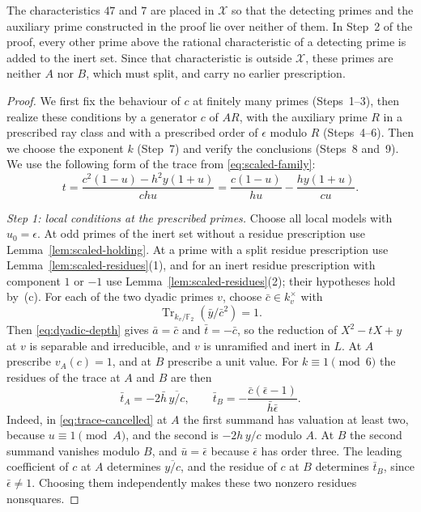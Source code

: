 \documentclass[11pt]{article}
\theoremstyle{plain}
\theoremstyle{definition}
\theoremstyle{remark}
\newcommand{\F}{\mathbb F}
\begin{document}
The characteristics $47$ and $7$ are placed in $\mathcal X$ so that the
detecting primes and the auxiliary prime constructed in the proof lie
over neither of them.  In Step~2 of the proof, every other prime above
the rational characteristic of a detecting prime is added to the inert
set.  Since that characteristic is outside $\mathcal X$, these primes are
neither $A$ nor $B$, which must split, and carry no earlier prescription.

\begin{proof}
We first fix the behaviour of $c$ at finitely many primes (Steps~1--3),
then realize these conditions by a generator $c$ of $AR$, with the
auxiliary prime $R$ in a prescribed ray class and with a prescribed
order of $\epsilon$ modulo $R$ (Steps~4--6).  Then we choose the exponent
$k$ (Step~7) and verify the conclusions (Steps~8 and~9).  We use the
following form of the trace from \eqref{eq:scaled-family}:
\begin{equation}\label{eq:trace-cancelled}
 t=\frac{c^2(1-u)-h^2y(1+u)}{chu}
  =\frac{c(1-u)}{hu}-\frac{hy(1+u)}{cu}.
\end{equation}

\emph{Step 1: local conditions at the prescribed primes.}  Choose all
local models with $u_0=\epsilon$.  At odd primes of the inert set without
a residue prescription use Lemma~\ref{lem:scaled-holding}.  At a prime
with a split residue prescription use Lemma~\ref{lem:scaled-residues}(1),
and for an inert residue prescription with component $1$ or $-1$ use
Lemma~\ref{lem:scaled-residues}(2); their hypotheses hold by~(c).  For each of the two dyadic primes
$v$, choose $\bar c\in k_v^\times$ with
\[
 \operatorname{Tr}_{k_v/\F_2}(\bar y/\bar c^2)=1.
\]
Then \eqref{eq:dyadic-depth} gives $\bar a=\bar c$ and $\bar t=-\bar c$,
so the reduction of $X^2-tX+y$ at $v$ is separable and irreducible, and
$v$ is unramified and inert in $L$.  At $A$ prescribe $v_A(c)=1$, and at
$B$ prescribe a unit value.  For $k\equiv1\pmod6$ the residues of the
trace at $A$ and $B$ are then
\begin{equation}\label{eq:active-traces}
 \bar t_A=-2\bar h\,\overline{y/c},\qquad
 \bar t_B=-\frac{\bar c(\bar\epsilon-1)}{\bar h\bar\epsilon}.
\end{equation}
Indeed, in \eqref{eq:trace-cancelled} at $A$ the first summand has
valuation at least two, because $u\equiv1\pmod A$, and the second is
$-2h\,y/c$ modulo $A$.  At $B$ the second summand vanishes modulo $B$,
and $\bar u=\bar\epsilon$ because $\bar\epsilon$ has order three.  The
leading coefficient of $c$ at $A$ determines $\overline{y/c}$, and the
residue of $c$ at $B$ determines $\bar t_B$, since $\bar\epsilon\ne1$.
Choosing them independently makes these two nonzero residues
nonsquares.


\end{proof}
\end{document}
